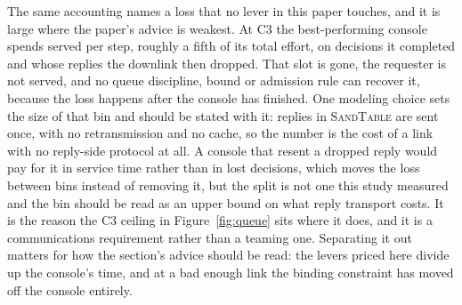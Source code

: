 \documentclass[11pt]{article}
\newcommand{\sandtable}{\textsc{SandTable}}
\begin{document}
The same accounting names a loss that no lever in this paper touches, and it is large where the
paper's advice is weakest. At C3 the best-performing console spends \KpJamLostAdmit{} served per
step, roughly a fifth of its total effort, on decisions it completed and whose replies the downlink
then dropped. That slot is gone, the requester is not served, and no queue discipline, bound or
admission rule can recover it, because the loss happens after the console has finished. One modeling
choice sets the size of that bin and should be stated with it: replies in \sandtable{} are sent
once, with no retransmission and no cache, so the number is the cost of a link with no reply-side
protocol at all. A console that resent a dropped reply would pay for it in service time rather than
in lost decisions, which moves the loss between bins instead of removing it, but the split is not
one this study measured and the bin should be read as an upper bound on what reply transport costs. It is the
reason the C3 ceiling in Figure~\ref{fig:queue} sits where it does, and it is a communications
requirement rather than a teaming one. Separating it out matters for how the section's advice should
be read: the levers priced here divide up the console's time, and at a bad enough link the binding
constraint has moved off the console entirely.
\end{document}
